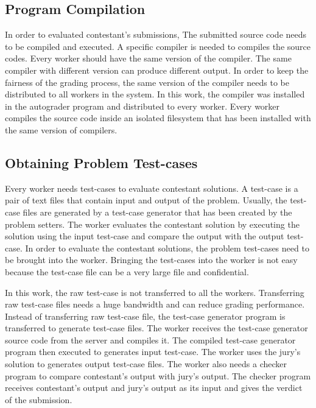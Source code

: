 \documentclass[conference,a4paper]{IEEEtran}
\begin{document}
\subsection{Program Compilation}

In order to evaluated contestant's submissions, The submitted source code needs to be compiled and executed. A specific compiler is needed to compiles the source codes. Every worker should have the same version of the compiler. The same compiler with different version can produce different output. In order to keep the fairness of the grading process, the same version of the compiler needs to be distributed to all workers in the system. In this work, the compiler was installed in the autograder program and distributed to every worker. Every worker compiles the source code inside an isolated filesystem that has been installed with the same version of compilers.

\subsection{Obtaining Problem Test-cases}

Every worker needs test-cases to evaluate contestant solutions. A test-case is a pair of text files that contain input and output of the problem. Usually, the test-case files are generated by a test-case generator that has been created by the problem setters. The worker evaluates the contestant solution by executing the solution using the input test-case and compare the output with the output test-case. In order to evaluate the contestant solutions, the problem test-cases need to be brought into the worker. Bringing the test-cases into the worker is not easy because the test-case file can be a very large file and confidential.

In this work, the raw test-case is not transferred to all the workers. Transferring raw test-case files needs a huge bandwidth and can reduce grading performance. Instead of transferring raw test-case file, the test-case generator program is transferred to generate test-case files. The worker receives the test-case generator source code from the server and compiles it. The compiled test-case generator program then executed to generates input test-case. The worker uses the jury's solution to generates output test-case files. The worker also needs a checker program to compare contestant's output with jury's output. The checker program receives contestant's output and jury's output as its input and gives the verdict of the submission.
\end{document}

